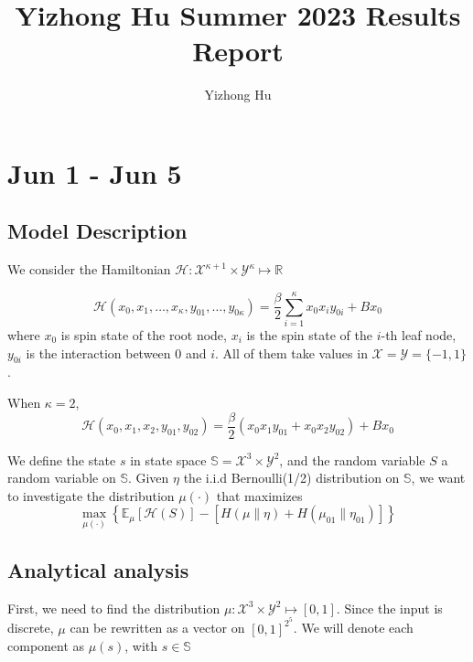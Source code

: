 \documentclass[12pt]{article}
\begin{document}
\title{Yizhong Hu Summer 2023 Results Report}
\author{Yizhong Hu}
\maketitle

\section{Jun 1 - Jun 5}

\subsection{Model Description}

We consider the Hamiltonian $\mathcal{H}: \mathcal{X}^{\kappa + 1} \times \mathcal{Y}^{\kappa} \mapsto \mathbb{R}$

\begin{equation*}
    \mathcal{H}(x_0, x_1, \ldots, x_\kappa, y_{01}, \ldots, y_{0\kappa} ) = \frac{\beta}{2}\sum_{i=1}^\kappa x_0x_iy_{0i} + Bx_0
\end{equation*}
where $x_0$ is spin state of the root node, $x_i$ is the spin state of the $i$-th leaf node, $y_{0i}$ is the interaction between
$0$ and $i$. All of them take values in $\mathcal{X} = \mathcal{Y} = \{-1, 1\}$.

When $\kappa=2$,
\begin{equation*}
    \mathcal{H}(x_0, x_1, x_2, y_{01}, y_{02} ) = \frac{\beta}{2}(x_0x_1y_{01} + x_0x_2y_{02}) + Bx_0
\end{equation*}

We define the state $s$ in state space $\mathbb{S} = \mathcal{X}^3 \times \mathcal{Y}^2$, and the random variable $S$ a random variable
on $\mathbb{S}$. Given $\eta$ the i.i.d Bernoulli(1/2) distribution on $\mathbb{S}$, we want to investigate the distribution $\mu(\cdot)$ that maximizes
\begin{equation*}
    \max_{\mu(\cdot)} \left\{\mathbb{E}_\mu[\mathcal{H}(S)] - \left[H(\mu \| \eta) + H(\mu_{01}\|\eta_{01} )\right]\right\}
\end{equation*}

\subsection{Analytical analysis}

First, we need to find the distribution $\mu: \mathcal{X}^3 \times \mathcal{Y}^2 \mapsto [0, 1]$. Since the input is discrete,
$\mu$ can be rewritten as a vector on $[0, 1]^{2^5}$. We will denote each component as $\mu(s)$, with $s\in \mathbb{S}$
\end{document}
